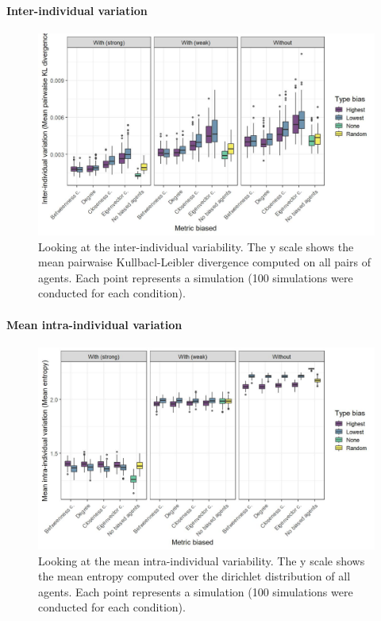 \documentclass[
]{article}
\begin{document}
\hypertarget{inter-individual-variation-4}{%
\paragraph{Inter-individual
variation}\label{inter-individual-variation-4}}

\begin{figure}[!H]

{\centering \includegraphics{./Figures/unnamed-chunk-219-1} 

}

\caption{Looking at the inter-individual variability. The y scale shows the mean pairwaise Kullbacl-Leibler divergence computed on all pairs of agents. Each point represents a simulation (100 simulations were conducted for each condition).}\label{fig:unnamed-chunk-219}
\end{figure}

\hypertarget{mean-intra-individual-variation-4}{%
\paragraph{Mean intra-individual
variation}\label{mean-intra-individual-variation-4}}

\begin{figure}[!H]

{\centering \includegraphics{./Figures/unnamed-chunk-220-1} 

}

\caption{Looking at the mean intra-individual variability. The y scale shows the mean entropy computed over the dirichlet distribution of all agents. Each point represents a simulation (100 simulations were conducted for each condition).}\label{fig:unnamed-chunk-220}
\end{figure}
\end{document}
